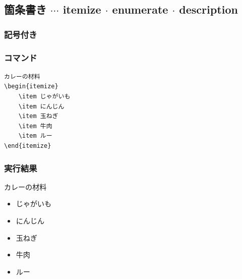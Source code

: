 \documentclass[a4j, titlepage]{jarticle}
\begin{document}
\setcounter{section}{1}


\subsection{箇条書き $\cdots$ itemize $\cdot$ enumerate $\cdot$ description}

\subsubsection{記号付き}
\begin{multicols}{2}

\subsubsection*{コマンド}
\begin{lstlisting}
カレーの材料
\begin{itemize}
    \item じゃがいも
    \item にんじん
    \item 玉ねぎ
    \item 牛肉
    \item ルー
\end{itemize}
\end{lstlisting}

\vfill\null
\columnbreak

\subsubsection*{実行結果}
\begin{screen}

    カレーの材料
    \begin{itemize}
        \item じゃがいも
        \item にんじん
        \item 玉ねぎ
        \item 牛肉
        \item ルー
    \end{itemize}

\end{screen}
\end{multicols}
\end{document}
